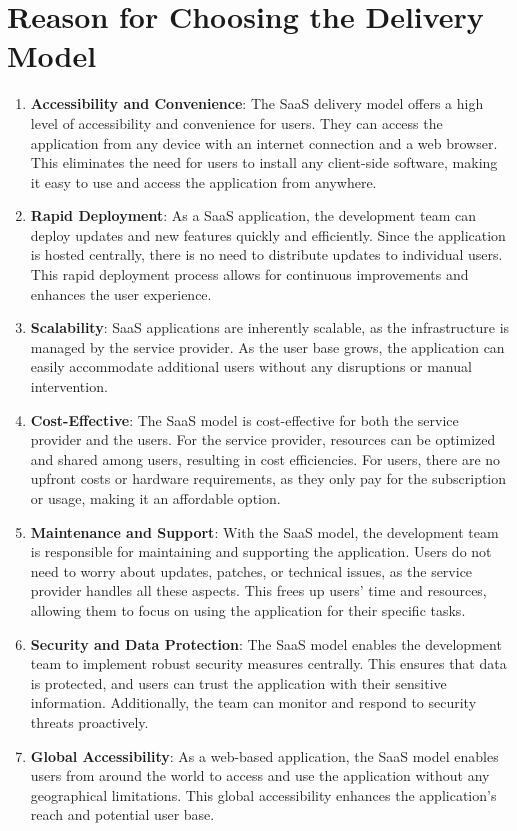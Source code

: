 \section{Reason for Choosing the Delivery Model}
\begin{enumerate}
    \item \textbf{Accessibility and Convenience}: The SaaS delivery model offers a high level of accessibility and convenience for users. They can access the application from any device with an internet connection and a web browser. This eliminates the need for users to install any client-side software, making it easy to use and access the application from anywhere.
    \item \textbf{Rapid Deployment}: As a SaaS application, the development team can deploy updates and new features quickly and efficiently. Since the application is hosted centrally, there is no need to distribute updates to individual users. This rapid deployment process allows for continuous improvements and enhances the user experience.
    \item \textbf{Scalability}: SaaS applications are inherently scalable, as the infrastructure is managed by the service provider. As the user base grows, the application can easily accommodate additional users without any disruptions or manual intervention.
    \item \textbf{Cost-Effective}: The SaaS model is cost-effective for both the service provider and the users. For the service provider, resources can be optimized and shared among users, resulting in cost efficiencies. For users, there are no upfront costs or hardware requirements, as they only pay for the subscription or usage, making it an affordable option.
    \item \textbf{Maintenance and Support}: With the SaaS model, the development team is responsible for maintaining and supporting the application. Users do not need to worry about updates, patches, or technical issues, as the service provider handles all these aspects. This frees up users' time and resources, allowing them to focus on using the application for their specific tasks.
    \item \textbf{Security and Data Protection}: The SaaS model enables the development team to implement robust security measures centrally. This ensures that data is protected, and users can trust the application with their sensitive information. Additionally, the team can monitor and respond to security threats proactively.
    \item \textbf{Global Accessibility}: As a web-based application, the SaaS model enables users from around the world to access and use the application without any geographical limitations. This global accessibility enhances the application's reach and potential user base.
\end{enumerate}

